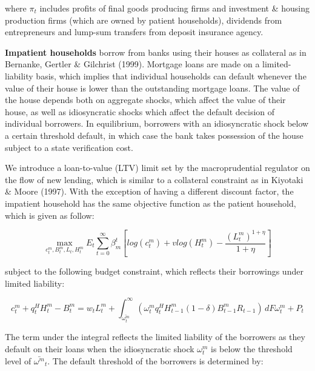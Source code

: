 \documentclass[12pt]{article}
\numberwithin{equation}{section}
\begin{document}
where $\pi_{t}$ includes profits of final goods producing firms and investment \& housing production firms (which are owned by patient households), dividends from entrepreneurs and lump-sum transfers from deposit insurance agency. 




\noindent
\textbf{Impatient households} borrow from banks using their houses as collateral as in Bernanke, Gertler \& Gilchrist (1999). Mortgage loans are made on a limited-liability basis, which implies that individual households can default whenever the value of their house is lower than the outstanding mortgage loans. The value of the house depends both on aggregate shocks, which affect the value of their house, as well as idiosyncratic shocks which affect the default decision of individual borrowers. In equilibrium, borrowers with an idiosyncratic shock below a certain threshold default, in which case the bank takes possession of the house subject to a state verification cost.

We introduce a loan-to-value (LTV) limit set by the macroprudential regulator on the flow of new lending, which is similar to a collateral constraint as in Kiyotaki \& Moore (1997). With the exception of having a different discount factor, the impatient household has the same objective function as the patient household, which is given as follow: 

\begin{equation}
\max_{c^m_t,B^m_t,L_{t},H^m_t}E_t\sum _{t=0}^{\infty } \beta^t_{m} [log(c^m_t)+vlog(H^m_t)-\frac{(L^m_t)^{1+\eta}}{1+\eta} ]
\end{equation}

subject to the following budget constraint, which reflects their borrowings under limited liability: 

\begin{equation}
c^m_t+q^H_{t}H^m_{t} -B^m_{t}=w_{t}L^m_{t}+\int_{\bar{\omega^m_{t} }}^\infty  \left(\omega^m_{t} q^H_{t} H^m_{t-1} (1-\delta)B^m_{t-1}R_{t-1}\right) \, dF\omega^m_{t} + P_{t}
\end{equation}

The term under the integral reflects the limited liability of the borrowers as they default on their loans when the idiosyncratic shock $\omega^m_{t}$ is below the threshold level of $\bar{\omega^m}_t$. The default threshold of the borrowers is determined by: 
\end{document}
